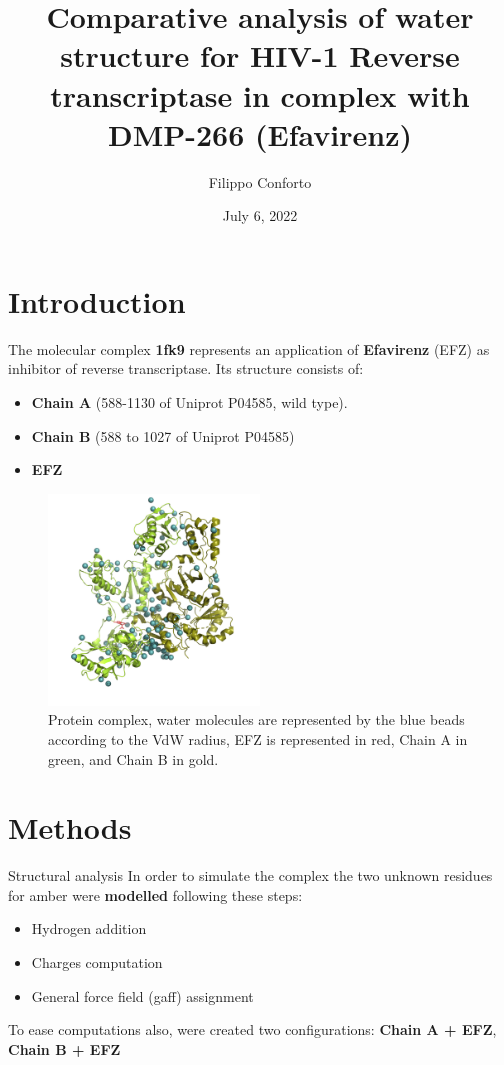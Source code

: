 \documentclass{beamer}
\title{Comparative analysis of water structure
for HIV-1 Reverse transcriptase in
complex with DMP-266 (Efavirenz)}
\date{July 6, 2022}
\author{Filippo Conforto}
\institute{Università degli studi di Padova \\ Molecular Simulations}
\begin{document}
\maketitle

\section{Introduction}
\begin{frame}
    The molecular complex \textbf{1fk9} represents an application of \textbf{Efavirenz} (EFZ) as inhibitor of reverse transcriptase. Its structure consists of:
    \begin{itemize}
        \item \textbf{Chain A}  (588-1130 of Uniprot P04585, wild type).
        \item \textbf{Chain B}  (588 to 1027 of Uniprot P04585)
        \item \textbf{EFZ}
    \end{itemize}
\end{frame}
\begin{frame}
    \begin{figure}
        \centering
        \includegraphics[width=0.5\textwidth]{../figures/water.png}
        \caption{Protein complex, water molecules are represented by the blue beads according to the VdW radius, EFZ is represented in red, Chain A in green, and Chain B in gold. \label{fig:total}}
    \end{figure}
\end{frame}

\section{Methods}
\begin{frame}{Structural analysis}
    In order to simulate the complex the two unknown residues for amber were \textbf{modelled}  following these steps:

    \begin{itemize}
        \item Hydrogen addition
        \item Charges computation
        \item General force field (gaff) assignment
    \end{itemize}

    To ease computations also, were created two configurations: \textbf{Chain A + EFZ}, \textbf{Chain B + EFZ}
\end{frame}
\end{document}
